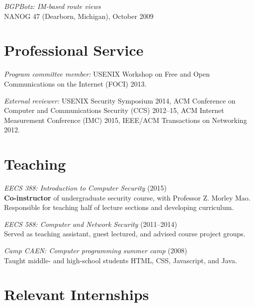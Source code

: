 \documentclass[margin,11pt]{res} %
\begin{document}

\emph{BGPBotz: IM-based route views} \\
    NANOG 47 (Dearborn, Michigan), October 2009

\vspace{6pt}
\section{\large Professional Service}

     \emph{Program committee member:}
          USENIX Workshop on Free and Open Communications on the Internet (FOCI) 2013.
     
    \emph{External reviewer:}
    USENIX Security Symposium 2014,
    ACM Conference on Computer and Communications Security (CCS) 2012--15,
    ACM Internet Measurement Conference (IMC) 2015,
    IEEE/ACM Transactions on Networking 2012.

\vspace{6pt}
\section{\large Teaching}

    \emph{EECS 388: Introduction to Computer Security}  (2015)\\
    \textbf{Co-instructor} of undergraduate security course, with Professor Z. Morley Mao. Responsible for teaching half of lecture sections and developing curriculum.
    
    \emph{EECS 588: Computer and Network Security} (2011--2014)\\
    Served as teaching assistant, guest lectured, and advised course project groups.
    
    
    \emph{Camp CAEN: Computer programming summer camp}  (2008)\\
    Taught middle- and high-school students HTML, CSS, Javascript, and Java.

\vspace{6pt}
\section{\large Relevant Internships}
\end{document}
